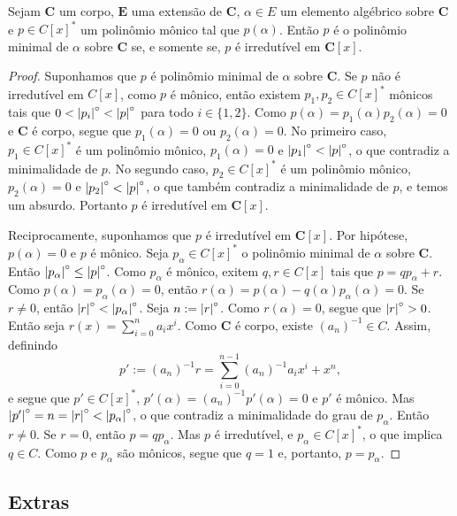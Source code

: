 \begin{proposition}
	Sejam $\bm C$ um corpo, $\bm E$ uma extensão de $\bm C$, $\alpha \in E$ um elemento algébrico sobre $\bm C$ e $p \in C[x]^*$ um polinômio mônico tal que $p(\alpha)$. Então $p$ é o polinômio minimal de $\alpha$ sobre $\bm C$ se, e somente se, $p$ é irredutível em $\bm C[x]$.
\end{proposition}
\begin{proof}
	Suponhamos que $p$ é polinômio minimal de $\alpha$ sobre $\bm C$. Se $p$ não é irredutível em $C[x]$, como $p$ é mônico, então existem $p_1,p_2 \in C[x]^*$ mônicos tais que $0 < \left\vert{p_i}\right\vert^{\circ} < \left\vert{p}\right\vert^{\circ}$ para todo $i \in \{1,2\}$. Como $p(\alpha)=p_1(\alpha)p_2(\alpha)=0$ e $\bm C$ é corpo, segue que $p_1(\alpha)=0$ ou $p_2(\alpha)=0$. No primeiro caso, $p_1 \in C[x]^*$ é um polinômio mônico, $p_1(\alpha)=0$ e $\left\vert{p_1}\right\vert^{\circ} < \left\vert{p}\right\vert^{\circ}$, o que contradiz a minimalidade de $p$. No segundo caso, $p_2 \in C[x]^*$ é um polinômio mônico, $p_2(\alpha)=0$ e $\left\vert{p_2}\right\vert^{\circ} < \left\vert{p}\right\vert^{\circ}$, o que também contradiz a minimalidade de $p$, e temos um absurdo. Portanto $p$ é irredutível em $\bm C[x]$.

	Reciprocamente, suponhamos que $p$ é irredutível em $\bm C[x]$. Por hipótese, $p(\alpha)=0$ e $p$ é mônico. Seja $p_\alpha \in C[x]^*$ o polinômio minimal de $\alpha$ sobre $\bm C$. Então $\left\vert{p_\alpha}\right\vert^{\circ} \leq \left\vert{p}\right\vert^{\circ}$. Como $p_\alpha$ é mônico, exitem $q,r \in C[x]$ tais que $p = qp_\alpha+r$. Como $p(\alpha) = p_\alpha(\alpha) = 0$, então $r(\alpha) = p(\alpha) - q(\alpha)p_\alpha(\alpha) = 0$. Se $r \neq 0$, então $\left\vert{r}\right\vert^{\circ} < \left\vert{p_\alpha}\right\vert^{\circ}$. Seja $n := \left\vert{r}\right\vert^{\circ}$. Como $r(\alpha)=0$, segue que $\left\vert{r}\right\vert^{\circ}>0$. Então seja $r(x) = \sum_{i=0}^n a_ix^i$. Como $\bm C$ é corpo, existe $(a_n)^{-1} \in C$. Assim, definindo
	\begin{equation*}
	p' := (a_n)^{-1}r = \sum_{i=0}^{n-1} (a_n)^{-1}a_ix^i + x^n,
	\end{equation*}
e segue que $p' \in C[x]^*$, $p'(\alpha)=(a_n)^{-1}p'(\alpha)=0$ e $p'$ é mônico. Mas $\left\vert{p'}\right\vert^{\circ} = n = \left\vert{r}\right\vert^{\circ} < \left\vert{p_\alpha}\right\vert^{\circ}$, o que contradiz a minimalidade do grau de $p_\alpha$. Então $r \neq 0$. Se $r=0$, então $p=qp_\alpha$. Mas $p$ é irredutível, e $p_\alpha \in C[x]^*$, o que implica $q \in C$. Como $p$ e $p_\alpha$ são mônicos, segue que $q=1$ e, portanto, $p=p_\alpha$.
\end{proof}



\subsection{Extras}

